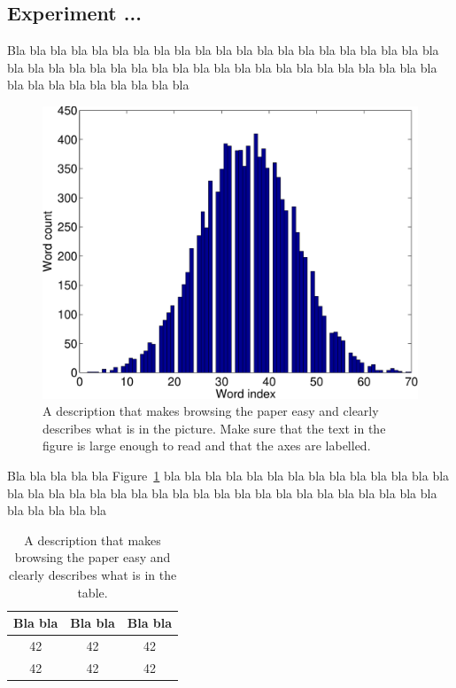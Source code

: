 \documentclass[a4paper,12pt]{article}
\begin{document}
\subsection{Experiment ...}

Bla bla bla bla bla bla bla bla bla bla bla bla bla bla bla bla bla
bla bla bla bla bla bla bla bla bla bla bla bla bla bla bla bla bla
bla bla bla bla bla bla bla bla bla bla bla bla bla bla bla bla bla

\begin{figure}
\centering
\includegraphics[width=0.8\linewidth]{histogram}
\caption{A description that makes browsing the paper easy and clearly
describes what is in the picture. Make sure that the text in the figure
is large enough to read and that the axes are labelled.}
\label{fig:histogram}
\end{figure}

Bla bla bla bla bla Figure~\ref{fig:histogram} bla bla bla bla bla bla
bla bla bla bla bla bla bla bla bla bla bla bla bla bla bla bla bla
bla bla bla bla bla bla bla bla bla bla bla bla bla bla bla bla bla

\begin{table}
\begin{center}
\begin{tabular}{|c|c|c|}
\hline
Bla bla & Bla bla & Bla bla \\ \hline
42 & 42 & 42 \\ \hline
42 & 42 & 42 \\ \hline
\end{tabular}
\caption{A description that makes browsing the paper easy and clearly
describes what is in the table.}
\label{tab:results}
\end{center}
\end{table}
\end{document}
